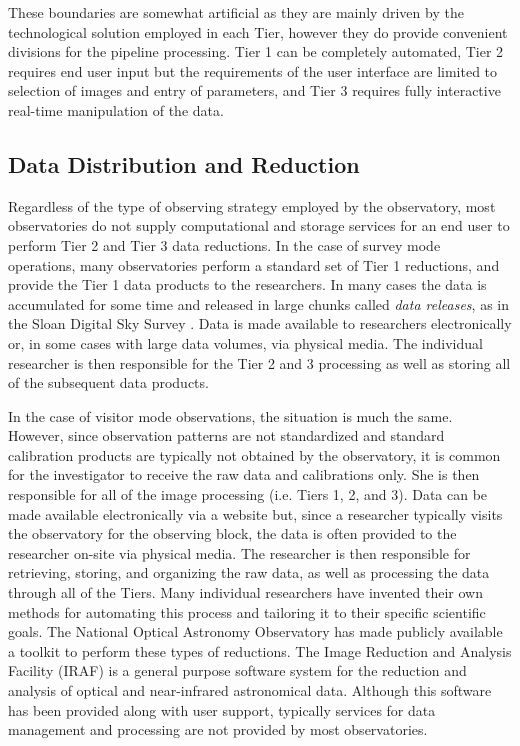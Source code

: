 \documentclass[10pt,conference]{IEEEtran}
\begin{document}
These boundaries are somewhat artificial as they are mainly driven by the technological solution employed in each Tier, however they do provide convenient divisions for the pipeline processing. Tier 1 can be completely automated, Tier 2 requires end user input but the requirements of the user interface are limited to selection of images and entry of parameters, and Tier 3 requires fully interactive real-time manipulation of the data. 

\subsection{Data Distribution and Reduction}\label{sec:reduction}

Regardless of the type of observing strategy employed by the observatory, most observatories do not supply computational and storage services for an end user to perform Tier 2 and Tier 3 data reductions. In the case of survey mode operations, many observatories perform a standard set of Tier 1 reductions, and provide the Tier 1 data products to the researchers. In many cases the data is accumulated for some time and released in large chunks called {\it data releases}, as in the Sloan Digital Sky Survey \cite{york2000}. Data is made available to researchers electronically or, in some cases with large data volumes, via physical media. The individual researcher is then responsible for the Tier 2 and 3 processing as well as storing all of the subsequent data products.

In the case of visitor mode observations, the situation is much the same. However, since observation patterns are not standardized and standard calibration products are typically not obtained by the observatory, it is common for the investigator to receive the raw data and calibrations only. She is then responsible for all of the image processing (i.e. Tiers 1, 2, and 3). Data can be made available electronically via a website but, since a researcher typically visits the observatory for the observing block, the data is often provided to the researcher on-site via physical media. The researcher is then responsible for retrieving, storing, and organizing the raw data, as well as processing the data through all of the Tiers. Many individual researchers have invented their own methods for automating this process and tailoring it to their specific scientific goals. The National Optical Astronomy Observatory has made publicly available a toolkit to perform these types of reductions. The Image Reduction and Analysis Facility (IRAF) is a general purpose software system for the reduction and analysis of optical and near-infrared astronomical data. Although this software has been provided along with user support, typically services for data management and processing are not provided by most observatories. 
\end{document}
